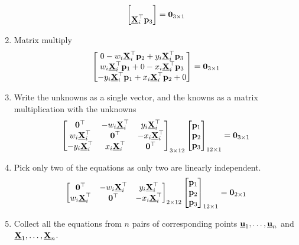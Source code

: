 \documentclass[times,singlecolumn]{article}
\newcommand{\ubfu}{\underline{\bfu}}
\begin{document}
\begin{enumerate}
\[\begin{bmatrix}
          \\
          \underline{\mathbf{X}}_i^\top\mathbf{p}_3
        \end{bmatrix} = \mathbf{0}_{3 \times 1}
        \]
      \item Matrix multiply
        \[
          \begin{bmatrix}
            0 -w_i \underline{\mathbf{X}}_i^\top\mathbf{p}_2 + y_i \underline{\mathbf{X}}_i^\top\mathbf{p}_3 \\
            w_i \underline{\mathbf{X}}_i^\top\mathbf{p}_1 + 0  -x_i \underline{\mathbf{X}}_i^\top\mathbf{p}_3 \\
            -y_i \underline{\mathbf{X}}_i^\top\mathbf{p}_1 + x_i \underline{\mathbf{X}}_i^\top\mathbf{p}_2 + 0
          \end{bmatrix} = \mathbf{0}_{3 \times 1}
          \]
        \item Write the unknowns as a single vector, and the knowns as a matrix
          multiplication with the unknowns
          \[
            \begin{bmatrix}
              \mathbf{0}^\top & -w_i \underline{\mathbf{X}}_i^\top & y_i \underline{\mathbf{X}}_i^\top \\
              w_i \underline{\mathbf{X}}_i^\top & \mathbf{0}^\top  & -x_i \underline{\mathbf{X}}_i^\top \\
              -y_i \underline{\mathbf{X}}_i^\top & x_i \underline{\mathbf{X}}_i^\top & \mathbf{0}^\top
              \end{bmatrix}_{3 \times 12}
              \begin{bmatrix}
                \mathbf{p}_1 \\
                \mathbf{p}_2 \\
                \mathbf{p}_3
                \end{bmatrix}_{12 \times 1}
                = \mathbf{0}_{3 \times 1}
            \]
     \item Pick only two of the equations as only two are linearly independent.
       \[
         \begin{bmatrix}
           \mathbf{0}^\top & -w_i \underline{\mathbf{X}}_i^\top & y_i \underline{\mathbf{X}}_i^\top \\
           w_i \underline{\mathbf{X}}_i^\top & \mathbf{0}^\top  & -x_i \underline{\mathbf{X}}_i^\top
         \end{bmatrix}_{2 \times 12}
         \begin{bmatrix}
           \mathbf{p}_1 \\
           \mathbf{p}_2 \\
           \mathbf{p}_3
         \end{bmatrix}_{12 \times 1}
         = \mathbf{0}_{2 \times 1}
       \]
     \item Collect all the equations from $n$ pairs of corresponding points
       $\ubfu_1, \dots, \ubfu_n$ and $\underline{\mathbf{X}}_1, \dots, \underline{\mathbf{X}}_n$.

\end{enumerate}
\end{document}
